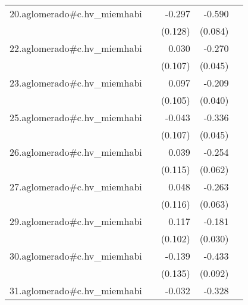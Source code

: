 {\begin{longtable}{l*{4}{D{.}{.}{-1}}}
\addlinespace
20.aglomerado#c.hv\_miemhabi&                     &      -0.297\sym{*}  &      -0.590\sym{***}&                     \\
            &                     &     (0.128)         &     (0.084)         &                     \\
\addlinespace
22.aglomerado#c.hv\_miemhabi&                     &       0.030         &      -0.270\sym{***}&                     \\
            &                     &     (0.107)         &     (0.045)         &                     \\
\addlinespace
23.aglomerado#c.hv\_miemhabi&                     &       0.097         &      -0.209\sym{***}&                     \\
            &                     &     (0.105)         &     (0.040)         &                     \\
\addlinespace
25.aglomerado#c.hv\_miemhabi&                     &      -0.043         &      -0.336\sym{***}&                     \\
            &                     &     (0.107)         &     (0.045)         &                     \\
\addlinespace
26.aglomerado#c.hv\_miemhabi&                     &       0.039         &      -0.254\sym{***}&                     \\
            &                     &     (0.115)         &     (0.062)         &                     \\
\addlinespace
27.aglomerado#c.hv\_miemhabi&                     &       0.048         &      -0.263\sym{***}&                     \\
            &                     &     (0.116)         &     (0.063)         &                     \\
\addlinespace
29.aglomerado#c.hv\_miemhabi&                     &       0.117         &      -0.181\sym{***}&                     \\
            &                     &     (0.102)         &     (0.030)         &                     \\
\addlinespace
30.aglomerado#c.hv\_miemhabi&                     &      -0.139         &      -0.433\sym{***}&                     \\
            &                     &     (0.135)         &     (0.092)         &                     \\
\addlinespace
31.aglomerado#c.hv\_miemhabi&                     &      -0.032         &      -0.328\sym{***}&                     \\

\end{longtable}}
